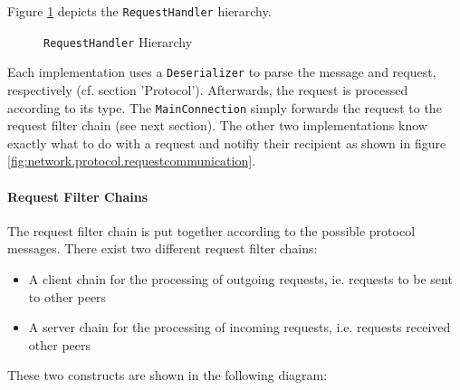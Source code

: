 Figure \ref{fig:network.protocol.requesthandler.uml} depicts the \texttt{RequestHandler} hierarchy.

\begin{figure}[H]
 \centering
 \caption{\texttt{RequestHandler} Hierarchy}
 \label{fig:network.protocol.requesthandler.uml}
\end{figure}

Each implementation uses a \texttt{Deserializer} to parse the message and request, respectively (cf. section 'Protocol'). Afterwards, the request is processed according to its type. The \texttt{MainConnection} simply forwards the request to the request filter chain (see next section). The other two implementations know exactly what to do with a request and notifiy their recipient as shown in figure \ref{fig:network.protocol.requestcommunication}.


\paragraph{Request Filter Chains}
The request filter chain is put together according to the possible protocol messages. There exist two different request filter chains: 

\begin{itemize}
 \item A client chain for the processing of outgoing requests, ie. requests to be sent to other peers
 \item A server chain for the processing of incoming requests, i.e. requests received other peers
\end{itemize}

These two constructs are shown in the following diagram:

